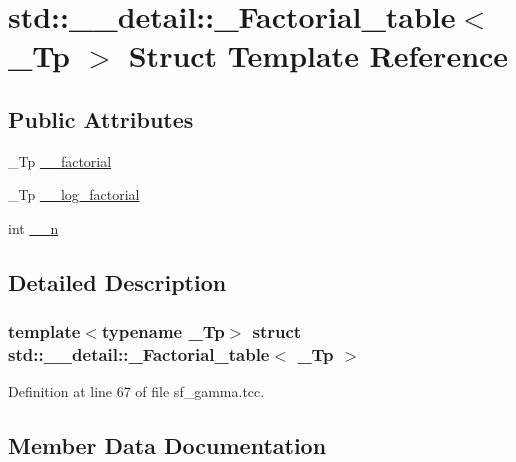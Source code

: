\hypertarget{structstd_1_1____detail_1_1__Factorial__table}{}\section{std\+:\+:\+\_\+\+\_\+detail\+:\+:\+\_\+\+Factorial\+\_\+table$<$ \+\_\+\+Tp $>$ Struct Template Reference}
\label{structstd_1_1____detail_1_1__Factorial__table}
\subsection*{Public Attributes}
\begin{DoxyCompactItemize}
\item 
\+\_\+\+Tp \hyperlink{structstd_1_1____detail_1_1__Factorial__table_a4e8d20f3fa301037b097bb9f8e5f2060}{\+\_\+\+\_\+factorial}
\item 
\+\_\+\+Tp \hyperlink{structstd_1_1____detail_1_1__Factorial__table_a9d4b412d4d8b46ec660b0441516f412c}{\+\_\+\+\_\+log\+\_\+factorial}
\item 
int \hyperlink{structstd_1_1____detail_1_1__Factorial__table_a08dfe7484fca4bcdd1969ce2fa73edc6}{\+\_\+\+\_\+n}
\end{DoxyCompactItemize}


\subsection{Detailed Description}
\subsubsection*{template$<$typename \+\_\+\+Tp$>$\newline
struct std\+::\+\_\+\+\_\+detail\+::\+\_\+\+Factorial\+\_\+table$<$ \+\_\+\+Tp $>$}



Definition at line 67 of file sf\+\_\+gamma.\+tcc.



\subsection{Member Data Documentation}
\mbox{\label{structstd_1_1____detail_1_1__Factorial__table_a4e8d20f3fa301037b097bb9f8e5f2060}} 

